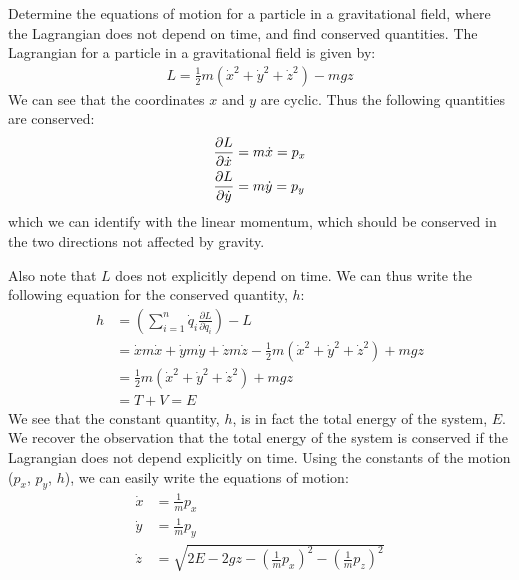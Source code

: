 \begin{example}{0pt}{Determine the equations of motion for a particle in a gravitational field, where the Lagrangian does not depend on time, and find conserved quantities.}{}
The Lagrangian for a particle in a gravitational field is given by:
\begin{align*}
L=\frac{1}{2}m(\dot{x}^2+\dot{y}^2+\dot{z}^2)-mgz
\end{align*}
We can see that the coordinates $x$ and $y$ are cyclic. Thus the following quantities are conserved:
\begin{align*}
\frac{\partial L}{\partial \dot{x}}&=m\dot{x}=p_x\\
\frac{\partial L}{\partial \dot{y}}&=m\dot{y}=p_y
\end{align*}
which we can identify with the linear momentum, which should be conserved in the two directions not affected by gravity.

Also note that $L$ does not explicitly depend on time. We can thus write the following equation for the conserved quantity, $h$:
\begin{align*}
h&=\left(\sum_{i=1}^n \dot{q}_i\frac{\partial L}{\partial \dot{q}_i}\right) -L \nonumber\\
&=\dot{x}m\dot{x}+\dot{y}m\dot{y}+\dot{z}m\dot{z}-\frac{1}{2}m(\dot{x}^2+\dot{y}^2+\dot{z}^2)+mgz\nonumber\\
&=\frac{1}{2}m(\dot{x}^2+\dot{y}^2+\dot{z}^2)+mgz\nonumber\\
&=T+V=E
\end{align*}
We see that the constant quantity, $h$, is in fact the total energy of the system, $E$. We recover the observation that the total energy of the system is conserved if the Lagrangian does not depend explicitly on time. Using the constants of the motion ($p_x$, $p_y$, $h$), we can easily write the equations of motion:
\begin{align*}
\dot{x}&=\frac{1}{m}p_x\\
\dot{y}&=\frac{1}{m}p_y\\
\dot{z}&=\sqrt{2E-2gz-\left(\frac{1}{m}p_x\right)^2-\left(\frac{1}{m}p_z\right)^2}
\end{align*}


\end{example}
